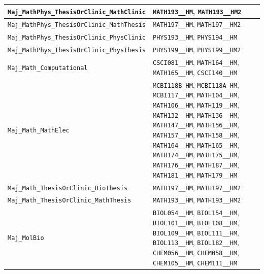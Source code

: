 \begin{longtable}{|p{4.4in}|p{4.4in}|}
    \verb|Maj_MathPhys_ThesisOrClinic_MathClinic| & \verb|MATH193__HM|, \verb|MATH193__HM2|\\\hline
    \verb|Maj_MathPhys_ThesisOrClinic_MathThesis| & \verb|MATH197__HM|, \verb|MATH197__HM2|\\\hline
    \verb|Maj_MathPhys_ThesisOrClinic_PhysClinic| & \verb|PHYS193__HM|, \verb|PHYS194__HM|\\\hline
    \verb|Maj_MathPhys_ThesisOrClinic_PhysThesis| & \verb|PHYS199__HM|, \verb|PHYS199__HM2|\\\hline
    \verb|Maj_Math_Computational| & \verb|CSCI081__HM|, \verb|MATH164__HM|, \verb|MATH165__HM|, \verb|CSCI140__HM|\\\hline
    \verb|Maj_Math_MathElec| & \verb|MCBI118B_HM|, \verb|MCBI118A_HM|, \verb|MCBI117__HM|, \verb|MATH104__HM|, \verb|MATH106__HM|, \verb|MATH119__HM|, \verb|MATH132__HM|, \verb|MATH136__HM|, \verb|MATH147__HM|, \verb|MATH156__HM|, \verb|MATH157__HM|, \verb|MATH158__HM|, \verb|MATH164__HM|, \verb|MATH165__HM|, \verb|MATH174__HM|, \verb|MATH175__HM|, \verb|MATH176__HM|, \verb|MATH187__HM|, \verb|MATH181__HM|, \verb|MATH179__HM|\\\hline
    \verb|Maj_Math_ThesisOrClinic_BioThesis| & \verb|MATH197__HM|, \verb|MATH197__HM2|\\\hline
    \verb|Maj_Math_ThesisOrClinic_MathThesis| & \verb|MATH193__HM|, \verb|MATH193__HM2|\\\hline
    \verb|Maj_MolBio| & \verb|BIOL054__HM|, \verb|BIOL154__HM|, \verb|BIOL101__HM|, \verb|BIOL108__HM|, \verb|BIOL109__HM|, \verb|BIOL111__HM|, \verb|BIOL113__HM|, \verb|BIOL182__HM|, \verb|CHEM056__HM|, \verb|CHEM058__HM|, \verb|CHEM105__HM|, \verb|CHEM111__HM|\\\hline

\end{longtable}
